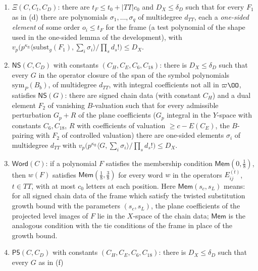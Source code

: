 \begin{definition}
\begin{enumerate}[label=(\alph*)]
$F_1\in\mathrm{Op}_{c_0}(\{F^{\mathrm s}_b\})$ with $\Theta(F_1)\in\linkGR_e(\lambda_{\mathrm{fl}})\smallsetminus\varpi\linkGR_e(\lambda_{\mathrm{fl}})$
there is $T\in\varpi^{-t_F}\linkGH_{e_t}(\lambda_{\mathrm{fl}})^\vee\cap\linkGR'_e(\lambda_{\mathrm{fl}})$ with
$T\in\varpi^{c'}\linkGR'_{e'}(\lambda_{\mathrm{fl}})$ for every other Hecke edge $e'\ne e$ of type $r$ with the target of $e$, and
$v_p\bigl(b(\Theta(F_1),T)\bigr)\le D_F$.
\item $\Xi(C,C_t,C_D)$: there are $t_F\le t_0+|TT|c_0$ and $D_X\le\delta_D$ such that for every $F_1$ as in (d) there
are polynomials $\sigma_1,\dots,\sigma_q$ of multidegree $d_{TT}$, each a \emph{one-sided element} of some order $o_i\le
t_F$ for the frame (a test polynomial of the shape used in the one-sided lemma of the development), with
$v_p\bigl(p^{\kappa_{\mathrm{fl}}}\langle\mathrm{subst}_g(F_1),\sum_i\sigma_i\rangle/\prod_sd_s!\bigr)\le D_X$.
\item $\mathsf{NS}(C,C_D)$ with constants $(C_H,C_E,C_6,C_{18})$: there is $D_X\le\delta_D$ such that every $G$ in the operator
closure of the span of the symbol polynomials $\mathrm{sym}_P(B_b)$, of multidegree $d_{TT}$, with integral coefficients
not all in $\varpi\OO$, satisfies $\mathsf{NS}(G)$: there are signed chain data (with constant $C_H$) and a dual element
$F_2$ of vanishing $B$-valuation such that for every admissible perturbation $G_p+R$ of the plane coefficients
($G_p$ integral in the $Y$-space with constants $C_6,C_{18}$, $R$ with coefficients of valuation $\ge c-E(C_E)$, the
$B$-pairing with $F_2$ of controlled valuation) there are one-sided elements $\sigma_i$ of multidegree $d_{TT}$ with
$v_p\bigl(p^{\kappa_{\mathrm{fl}}}\langle G,\sum_i\sigma_i\rangle/\prod_sd_s!\bigr)\le D_X$.
\item $\mathsf{Word}(C)$: if a polynomial $F$ satisfies the membership condition $\mathsf{Mem}(0,\frac18)$, then $w(F)$
satisfies $\mathsf{Mem}(\frac18,\frac38)$ for every word $w$ in the operators $E^{(t)}_{ij}$, $t\in TT$, with at most $c_0$
letters at each position. Here $\mathsf{Mem}(s_c,s_L)$ means: for all signed chain data of the frame which satisfy the
twisted substitution growth bound with the parameters $(s_c,s_L)$, the plane coefficients of the projected level images
of $F$ lie in the $X$-space of the chain data; $\mathsf{Mem}$ is the analogous condition with the tie conditions of the
frame in place of the growth bound.
\item $\mathsf{P5}(C,C_D)$ with constants $(C_H,C_E,C_6,C_{18})$: there is $D_X\le\delta_D$ such that every $G$ as in (f)

\end{enumerate}
\end{definition}
